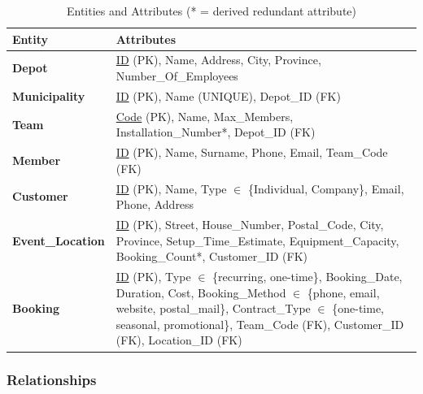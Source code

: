 \documentclass[12pt]{article}
\begin{document}
\begin{table}[H]
  \renewcommand{\arraystretch}{1.3}
  \begin{tabularx}{\textwidth}{|l|X|}
  \hline
  \textbf{Entity} & \textbf{Attributes} \\ \hline
  \textbf{Depot} &
    \underline{ID} (PK), Name, Address, City, Province, Number\_Of\_Employees \\ \hline
  \textbf{Municipality} &
    \underline{ID} (PK), Name (UNIQUE), Depot\_ID (FK) \\ \hline
  \textbf{Team} &
    \underline{Code} (PK), Name, Max\_Members, Installation\_Number*,
    Depot\_ID (FK) \\ \hline
  \textbf{Member} &
    \underline{ID} (PK), Name, Surname, Phone, Email, Team\_Code (FK) \\ \hline
  \textbf{Customer} &
    \underline{ID} (PK), Name, Type $\in$ \{Individual, Company\},
    Email, Phone, Address \\ \hline
  \textbf{Event\_Location} &
    \underline{ID} (PK), Street, House\_Number, Postal\_Code, City, Province,
    Setup\_Time\_Estimate, Equipment\_Capacity, Booking\_Count*,
    Customer\_ID (FK) \\ \hline
  \textbf{Booking} &
    \underline{ID} (PK),
    Type $\in$ \{recurring, one-time\},
    Booking\_Date, Duration, Cost,
    Booking\_Method $\in$ \{phone, email, website, postal\_mail\},
    Contract\_Type $\in$ \{one-time, seasonal, promotional\},
    Team\_Code (FK), Customer\_ID (FK), Location\_ID (FK) \\ \hline
  \end{tabularx}
  \caption{Entities and Attributes (* = derived redundant attribute)}
\end{table}

\subsubsection{Relationships}
\end{document}
